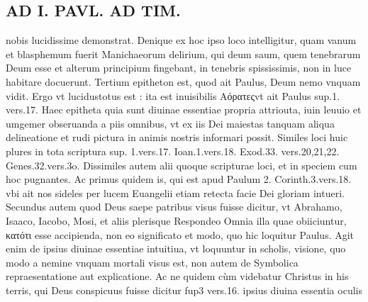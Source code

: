 \documentclass{article}
\begin{document}
\begin{pages}
\section*{AD I. PAVL. AD TIM. }
\marginpar{[ p.450 ]}\pstart nobis lucidissime demonstrat. Denique ex hoc ipso loco intelligitur, quam vanum et blasphemum fuerit Manichaeorum delirium, qui deum saum, quem tenebrarum Deum esse et alterum principium fingebant, in tenebris spississimis, non in luce habitare docuerunt.  \pend\pstart Tertium epitheton est, quod ait Paulus, Deum nemo vnquam vidit. Ergo vt lucidustotus est : ita est inuisibilis Αόρατεςvt ait Paulus sup.1. vers.17. Haec epitheta quia sunt diuinae essentiae propria attriouta, iuin leuuio et umgemer obseruanda a piis omnibus, vt ex iis Dei maiestas tanquam aliqua delineatione et rudi pictura in animis nostris informari possit.  \pend\pstart Similes loci huic plures in tota scriptura sup. 1.vers.17. Ioan.1.vers.18. Exod.33. vers.20,21,22. Genes.32.vers.3o.  \pend\pstart Dissimiles autem alii quoque scripturae loci, et in speciem cum hoc pugnantes. Ac primus quidem is, qui est apud Paulum 2. Corinth.3.vers.18. vbi ait nos sideles per lucem Euangelii etiam retecta facie Dei gloriam intueri. Secundus autem quod Deus saepe patribus visus fuisse dicitur, vt Abrahamo, Isaaco, Iacobo, Mosi, et aliis plerisque  Respondeo Omnia illa quae obiiciuntur, κατότι esse accipienda, non eo significato et modo, quo hic loquitur Paulus. Agit enim de ipsius diuinae essentiae intuitiua, vt loquuntur in scholis, visione, quo modo a nemine vnquam mortali visus est, non autem de Symbolica repraesentatione aut explicatione. Ac ne quidem cùm videbatur Christus in his terris, qui Deus conspicuus fuisse dicitur fup3 vers.16. ipsius diuina essentia oculis  \pend

\end{pages}
\end{document}
